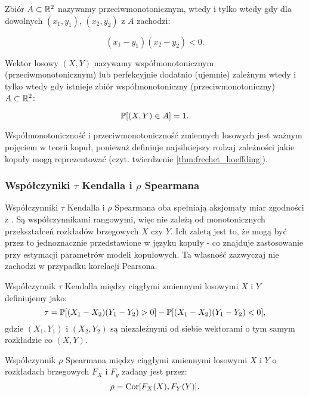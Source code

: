 \begin{df}
	Zbiór $A \subset \mathbb{R}^2$ nazywamy przeciwmonotonicznym, wtedy i tylko wtedy gdy dla dowolnych $(x_1, y_1)$, $(x_2, y_2)$ z $A$ zachodzi:
	
	$$ (x_1 - y_1)(x_2 - y_2) <0.$$
\end{df}


\begin{df}
	Wektor losowy $(X, Y)$ nazywamy współmonotonicznym (przeciwmonotonicznym) lub perfekcyjnie dodatnio (ujemnie) zależnym wtedy i tylko wtedy gdy istnieje zbiór współmonotoniczny (przeciwmonotoniczny) $A\subset\mathbb{R}^2$:
	
	$$ \mathbb{P}[(X,Y)\in A]=1.$$
\end{df}

Współmonotoniczność i przeciwmonotoniczność zmiennych losowych jest ważnym pojęciem w teorii kopuł, ponieważ definiuje najsilniejszy rodzaj zależności jakie kopuły mogą reprezentować (czyt. twierdzenie \ref{thm:frechet_hoeffding}).

\subsubsection{Współczyniki $\tau$ Kendalla i $\rho$ Spearmana}

Współczynniki $\tau$ Kendalla i $\rho$ Spearmana oba spełniają aksjomaty miar zgodności z \cite{Scarsini1984}. Są współczynnikami rangowymi, więc nie zależą od monotonicznych przekształceń rozkładów brzegowych $X$ czy $Y$. Ich zaletą jest to, że mogą być przez to jednoznacznie przedstawione w języku kopuły - co znajduje zastosowanie przy estymacji parametrów modeli kopułowych. Ta własność zazwyczaj nie zachodzi w przypadku korelacji Pearsona.

\begin{df}
	Współczynnik $\tau$ Kendalla między ciągłymi zmiennymi losowymi $X$ i $Y$ definiujemy jako:
	$$ \tau = \mathbb{P}[(X_1-X_2)(Y_1-Y_2)>0] - \mathbb{P}[(X_1-X_2)(Y_1-Y_2) <0], $$
	gdzie $(X_1, Y_1)$ i $(X_2, Y_2)$ są niezależnymi od siebie wektorami o tym samym rozkładzie co $(X, Y)$.
\end{df}

\begin{df}
	Współczynnik $\rho$ Spearmana między ciągłymi zmiennymi losowymi $X$ i $Y$ o rozkładach brzegowych $F_X$ i $F_y$ zadany jest przez:
	$$ \rho = \text{Cor}[F_X(X), F_Y(Y)].$$
\end{df}

